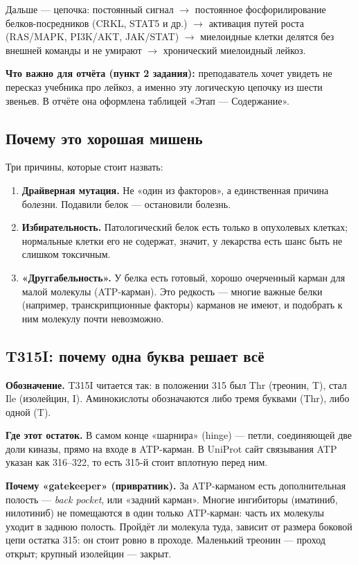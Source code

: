 \documentclass[11pt,a4paper]{article}
\begin{document}
Дальше --- цепочка: постоянный сигнал $\rightarrow$ постоянное фосфорилирование
белков-посредников (CRKL, STAT5 и др.) $\rightarrow$ активация путей роста
(RAS/MAPK, PI3K/AKT, JAK/STAT) $\rightarrow$ миелоидные клетки делятся без
внешней команды и не умирают $\rightarrow$ хронический миелоидный лейкоз.

\begin{note}
\textbf{Что важно для отчёта (пункт 2 задания):} преподаватель хочет увидеть не
пересказ учебника про лейкоз, а именно эту логическую цепочку из шести звеньев.
В отчёте она оформлена таблицей «Этап --- Содержание».
\end{note}

\subsection{Почему это хорошая мишень}

Три причины, которые стоит назвать:
\begin{enumerate}[leftmargin=*,topsep=2pt,itemsep=2pt]
\item \textbf{Драйверная мутация.} Не «один из факторов», а единственная причина
болезни. Подавили белок --- остановили болезнь.
\item \textbf{Избирательность.} Патологический белок есть только в опухолевых
клетках; нормальные клетки его не содержат, значит, у лекарства есть шанс быть
не слишком токсичным.
\item \textbf{«Друггабельность».} У белка есть готовый, хорошо очерченный карман
для малой молекулы (ATP-карман). Это редкость --- многие важные белки (например,
транскрипционные факторы) карманов не имеют, и подобрать к ним молекулу почти
невозможно.
\end{enumerate}

\subsection{T315I: почему одна буква решает всё}

\textbf{Обозначение.} T315I читается так: в положении 315 был Thr (треонин, T),
стал Ile (изолейцин, I). Аминокислоты обозначаются либо тремя буквами (Thr), либо
одной (T).

\textbf{Где этот остаток.} В самом конце «шарнира» (hinge) --- петли, соединяющей
две доли киназы, прямо на входе в ATP-карман. В UniProt сайт связывания ATP
указан как 316--322, то есть 315-й стоит вплотную перед ним.

\textbf{Почему «gatekeeper» (привратник).} За ATP-карманом есть дополнительная
полость --- \emph{back pocket}, или «задний карман». Многие ингибиторы (иматиниб,
нилотиниб) не помещаются в один только ATP-карман: часть их молекулы уходит в
заднюю полость. Пройдёт ли молекула туда, зависит от размера боковой цепи
остатка 315: он стоит ровно в проходе. Маленький треонин --- проход открыт;
крупный изолейцин --- закрыт.
\end{document}
